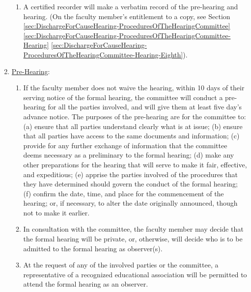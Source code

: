 \begin{enumerate}[label=\alph*)]
{\begin{enumerate}[label=\arabic*)]
								\item{
									\label{sec:DischargeForCauseHearing-ProceduresOfTheHearingCommittee-ProceduralConditions-Fifth}
									A certified recorder will make a verbatim record of the pre-hearing and hearing.
									(On the faculty member's entitlement to a copy, see Section
									\ref{sec:DischargeForCauseHearing-ProceduresOfTheHearingCommittee}
									\ref{sec:DischargeForCauseHearing-ProceduresOfTheHearingCommittee-Hearing}
									\ref{sec:DischargeForCauseHearing-ProceduresOfTheHearingCommittee-Hearing-Eighth}).
								}
							\end{enumerate}
						}
						\item{\underline{Pre-Hearing}:
							\label{sec:DischargeForCauseHearing-ProceduresOfTheHearingCommittee-PreHearing}
							\begin{enumerate}[label=\arabic*)]
								\item{If the faculty member does not waive the hearing, within 10 days of their serving notice of the formal hearing, the committee will conduct a pre-hearing for all the parties involved, and will give them at least five day's advance notice.  The purposes of the pre-hearing are for the committee to:}
								(a) ensure that all parties understand clearly what is at issue;
								(b) ensure that all parties have access to the same documents and information;
								(c) provide for any further exchange of information that the committee deems necessary as a preliminary to the formal hearing;
								(d) make any other preparations for the hearing that will serve to make it fair, effective, and expeditious;
								(e) apprise the parties involved of the procedures that they have determined should govern the conduct of the formal hearing;
								(f) confirm the date, time, and place for the commencement of the hearing; or, if necessary, to alter the date originally announced, though not to make it earlier.
								\item{
									\label{sec:DischargeForCauseHearing-ProceduresOfTheHearingCommittee-PreHearing-Second}
									In consultation with the committee, the faculty member may decide that the formal hearing will be private, or, otherwise, will decide who is to be admitted to the formal hearing as observer(s).}
								\item{At the request of any of the involved parties or the committee, a representative of a recognized educational association will be permitted to attend the formal hearing as an observer.}
							\end{enumerate}
}
\end{enumerate}
